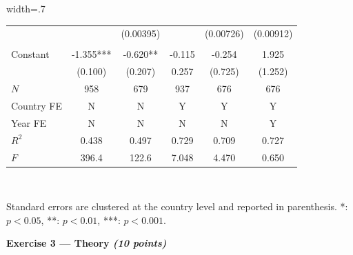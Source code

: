 \documentclass{article}
\begin{document}
\begin{table}[hp!]
\begin{adjustbox}{width=.7\textwidth}
\begin{tabular}{l|ccccc|}
\multicolumn{1}{|l|}{}            &                                  & (0.00395)                         &                                 & (0.00726) & (0.00912)  \\
\multicolumn{1}{|l|}{}            &       &    &           & &   \\
\multicolumn{1}{|l|}{Constant}      & -1.355*** & -0.620** & -0.115                          & -0.254  & 1.925    \\
\multicolumn{1}{|l|}{}            & (0.100)                            & (0.207)                           & 0.257                           & (0.725)   & (1.252)   \\ \hline
\multicolumn{1}{|l|}{$N$}           & 958                              & 679                             & 937                             & 676     & 676      \\
\multicolumn{1}{|l|}{Country FE}           & N &  N  &   Y   & Y  & Y    \\
\multicolumn{1}{|l|}{Year FE}           & N &  N  &   N   & N  & Y    \\
\multicolumn{1}{|l|}{$R^2$}          & 0.438                            & 0.497                           & 0.729                           & 0.709   & 0.727    \\
\multicolumn{1}{|l|}{$F$}           & 396.4                            & 122.6                           & 7.048                           & 4.470   & 0.650    \\ \hline
\end{tabular}
\end{adjustbox}
\\[1em]
\begin{minipage}{\textwidth} %
\footnotesize{Standard errors are clustered at the country level and reported in parenthesis. *: $p<0.05$, **: $p<0.01$, ***: $p<0.001$. \par}
\end{minipage}
\end{table}

\newpage
\vspace{1cm}
\textbf{Exercise 3 --- Theory \textit{(10 points)}} \\[1em]
\end{document}
